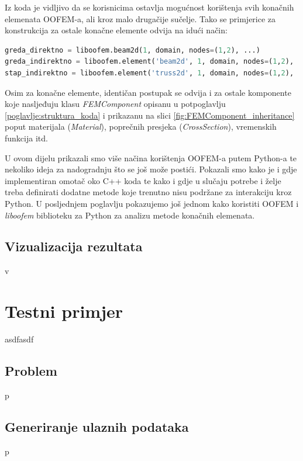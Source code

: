 \documentclass[a4paper,twoside,12pt]{memoir} %
\begin{document}
Iz koda je vidljivo da se korisnicima ostavlja mogućnost korištenja svih konačnih elemenata OOFEM-a, ali kroz malo drugačije sučelje. Tako se primjerice za konstrukcija za ostale konačne elemente odvija na idući način:

\begin{lstlisting}[language=python, caption={Primjer konstrukcije konačnih elemenata koji nemaju implementiran direktan poziv}]
greda_direktno = liboofem.beam2d(1, domain, nodes=(1,2), ...)
greda_indirektno = liboofem.element('beam2d', 1, domain, nodes=(1,2), ...)
stap_indirektno = liboofem.element('truss2d', 1, domain, nodes=(1,2), ...)
\end{lstlisting}

Osim za konačne elemente, identičan postupak se odvija i za ostale komponente koje nasljeđuju klasu \textit{FEMComponent} opisanu u potpoglavlju \ref{poglavlje:struktura_koda} i prikazanu na slici \ref{fig:FEMComponent_inheritance} poput materijala (\textit{Material}), poprečnih presjeka (\textit{CrossSection}), vremenskih funkcija itd. \par

U ovom dijelu prikazali smo više načina korištenja OOFEM-a putem Python-a te nekoliko ideja za nadogradnju što se još može postići. Pokazali smo kako je i gdje implementiran omotač oko C++ koda te kako i gdje u slučaju potrebe i želje treba definirati dodatne metode koje trenutno nisu podržane za interakciju kroz Python. U posljednjem poglavlju pokazujemo još jednom kako koristiti OOFEM i \textit{liboofem} biblioteku za Python za analizu metode konačnih elemenata.


\section{Vizualizacija rezultata}
v



\chapter{Testni primjer}
asdfasdf

\section{Problem}
p

\section{Generiranje ulaznih podataka}
p
\end{document}
